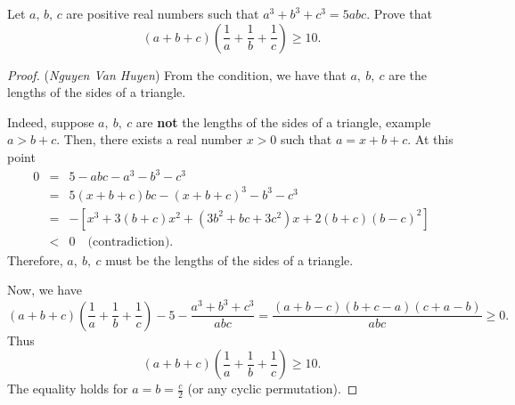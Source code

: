 \documentclass[12pt,a4paper]{book}
\begin{document}
\begin{pro_no_count}
Let $a,\,b,\,c$ are positive real numbers such that $a^3+b^3+c^3 = 5abc.$ Prove that
\[(a+b+c)\left(\frac{1}{a}+\frac{1}{b}+\frac{1}{c}\right) \geqslant 10.\]
\end{pro_no_count}

\begin{proof}
(\textit{Nguyen Van Huyen}) From the condition, we have that $a, \ b, \ c$ are the lengths of the sides of a triangle.

Indeed, suppose $a, \ b, \ c$ are \textbf{not} the lengths of the sides of a triangle, example $a>b+c.$ Then, there exists a real number $x>0$ such that $a=x+b+c.$ At this point
\[\begin{array}{lcl}
0 & = & 5 - abc - a^3 - b^3 - c^3 \\ 
& = & 5(x+b+c)bc  - (x+b+c)^3 - b^3 - c^3 \\
& = & -[x^3 + 3(b+c)x^2+(3b^2+bc+3c^2)x+2(b+c)(b-c)^2] \\
& < & 0 \quad \text{(contradiction)}.
\end{array}\]
Therefore, $a, \ b, \ c$ must be the lengths of the sides of a triangle.

Now, we have
\[(a+b+c)\left(\frac{1}{a}+\frac{1}{b}+\frac{1}{c}\right) - 5 - \frac{a^3+b^3+c^3}{abc} = \frac{(a+b-c)(b+c-a)(c+a-b)}{abc} \ge 0.\]
Thus
\[(a+b+c)\left(\frac{1}{a}+\frac{1}{b}+\frac{1}{c}\right) \ge 10.\]
The equality holds for $a=b=\frac{c}{2}$ (or any cyclic permutation).
\end{proof}
\end{document}
